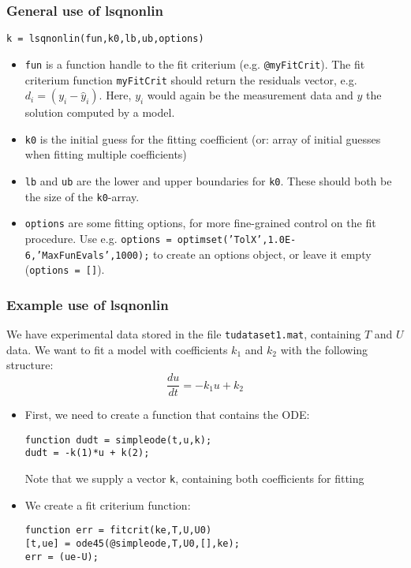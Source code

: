 \documentclass[11pt,table,final,fleqn,xcolor={usenames,dvipsnames,table}]{beamer}
\begin{document}
\begin{frame}[fragile] 
  \frametitle{General use of lsqnonlin}
  \begin{lstlisting}
k = lsqnonlin(fun,k0,lb,ub,options)
  \end{lstlisting}
  \begin{itemize}
    \item \lstinline$fun$ is a function handle to the fit criterium (e.g. \lstinline$@myFitCrit$). The fit criterium function \lstinline$myFitCrit$ should return the residuals vector, e.g. $d_i = \left(y_i - \hat{y}_i\right)$. 
  Here, $y_i$ would again be the measurement data and $\hat{y}$ the solution computed by a model.
  \item \lstinline$k0$ is the initial guess for the fitting coefficient (or: array of initial guesses when fitting multiple coefficients)
  \item \lstinline$lb$ and \lstinline$ub$ are the lower and upper boundaries for \lstinline$k0$. These should both be the size of the \lstinline$k0$-array.
  \item \lstinline$options$ are some fitting options, for more fine-grained control on the fit procedure. Use e.g. \lstinline$options = optimset(’TolX’,1.0E-6,’MaxFunEvals’,1000);$ to create an options object, or leave it empty (\lstinline$options = []$).
  \end{itemize}  
\end{frame}

\begin{frame}[fragile] 
  \frametitle{Example use of lsqnonlin}
  We have experimental data stored in the file \lstinline$tudataset1.mat$, containing $T$ and $U$ data. We want to fit a model with coefficients $k_1$ and $k_2$ with the following structure:
  \[
    \frac{du}{dt} = -k_1 u + k_2
  \]
  \pause
  \begin{itemize}
    \item First, we need to create a function that contains the ODE:
    \begin{lstlisting}
function dudt = simpleode(t,u,k);
dudt = -k(1)*u + k(2);
    \end{lstlisting}
    Note that we supply a vector \lstinline$k$, containing both coefficients for fitting
    \pause
    \item We create a fit criterium function:
    \begin{lstlisting}
function err = fitcrit(ke,T,U,U0)
[t,ue] = ode45(@simpleode,T,U0,[],ke);
err = (ue-U);
    \end{lstlisting}
  \end{itemize}
\end{frame}
\end{document}
